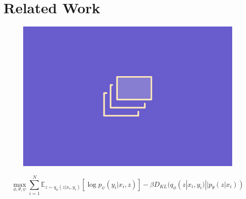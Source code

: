 \chapter{Related Work}
\label{text:related_work}


\begin{figure}[!ht]
\begin{center}
\includegraphics[width=\imgwidth]{images/placeholder.png}
\label{img:trajectron_example}
\end{center}
\end{figure}

\begin{equation}
\max_{\phi, \theta, \psi} \sum_{i=1}^N \mathbb{E}_{z \sim q_{\phi}(z | x_i, y_i)} [\log p_\psi (y_i | x_i, z)] - \beta D_{KL} (q_{\phi}(z | x_i, y_i) || p_{\theta}(z | x_i))
\label{eq:trajectron_loss}
\end{equation}




